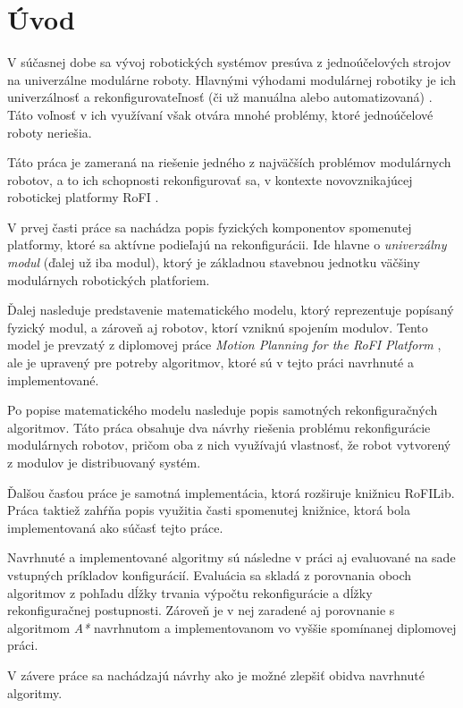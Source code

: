 \documentclass[
  printed, %
  oneside, %
  notable,   %
  nolof,     %
  nolot,     %
]{fithesis3}
\begin{document}
\chapter*{Úvod}
V súčasnej dobe sa vývoj robotických systémov presúva z jednoúčelových strojov na univerzálne modulárne roboty. Hlavnými výhodami modulárnej robotiky je ich univerzálnosť a rekonfigurovateľnosť (či už manuálna alebo automatizovaná) \cite{modularAdvantage}. Táto voľnosť v ich využívaní však otvára mnohé problémy, ktoré jednoúčelové roboty neriešia. 

Táto práca je zameraná na riešenie jedného z najväčších problémov modulárnych robotov, a to ich schopnosti rekonfigurovať sa, v kontexte novovznikajúcej robotickej platformy RoFI \cite{rofiWeb}. 

V prvej časti práce sa nachádza popis fyzických komponentov spomenutej platformy, ktoré sa aktívne podieľajú na rekonfigurácii. Ide hlavne o \textit{univerzálny modul} (ďalej už iba modul), ktorý je základnou stavebnou jednotku väčšiny modulárnych robotických platforiem. 

Ďalej nasleduje predstavenie matematického modelu, ktorý reprezentuje popísaný fyzický modul, a zároveň aj robotov, ktorí vzniknú spojením modulov. Tento model je prevzatý z diplomovej práce \textit{Motion Planning for the RoFI Platform} \cite{vozarovaMasterThesis}, ale je upravený pre potreby algoritmov, ktoré sú v tejto práci navrhnuté a implementované. 

Po popise matematického modelu nasleduje popis samotných rekonfiguračných algoritmov. Táto práca obsahuje dva návrhy riešenia problému rekonfigurácie modulárnych robotov, pričom oba z nich využívajú vlastnosť, že robot vytvorený z modulov je distribuovaný systém. 

Ďalšou časťou práce je samotná implementácia, ktorá rozširuje knižnicu RoFILib. Práca taktiež zahŕňa popis využitia časti spomenutej knižnice, ktorá bola implementovaná ako súčasť tejto práce. 

Navrhnuté a implementované algoritmy sú následne v práci aj evaluované na sade vstupných príkladov konfigurácií. Evaluácia sa skladá z porovnania oboch algoritmov z pohľadu dĺžky trvania výpočtu rekonfigurácie a dĺžky rekonfiguračnej postupnosti. Zároveň je v nej zaradené aj porovnanie s algoritmom \textit{A*} navrhnutom a implementovanom vo vyššie spomínanej diplomovej práci. 

V závere práce sa nachádzajú návrhy ako je možné zlepšiť obidva navrhnuté algoritmy. 
\end{document}
